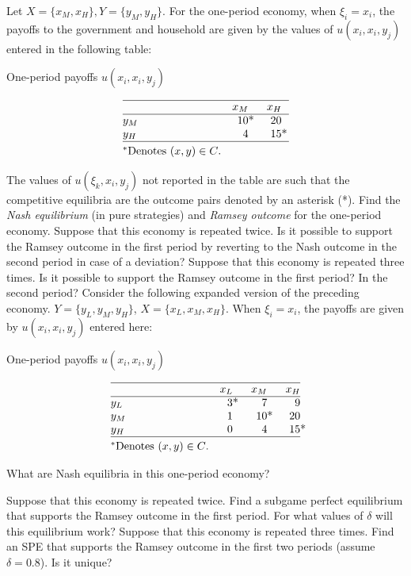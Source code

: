 Let $X= \{x_M,x_H\}, Y = \{y_M,y_H\}$. For the one-period economy,
when $\xi_i = x_i$, the payoffs to the government and household
are given by the values of $u(x_i,x_i,y_j)$ entered in
the following table:
\vfil\eject

\centerline{One-period payoffs $u(x_i,x_i,y_j)$}
$$\vbox{\offinterlineskip
\hrule
\halign{\strut #\hfil &\quad \hfil# &\quad \hfil# \cr
& $x_M$ & $x_H$ \cr \noalign{\hrule}
$y_M$ & $10\rlap{*}$ & $20$ \cr
$y_H$ & $4$ & $15\rlap{*}$ \cr\noalign{\hrule}
\noalign{\smallskip}
\hbox{$^\ast$Denotes $(x,y)\in C$.}\cr
              }}$$




\noindent
The values of $u(\xi_k,x_i,y_j)$ not reported in the table
are such that the competitive equilibria are the outcome pairs
denoted by an asterisk (*).
\medskip
{}  Find the {\it Nash equilibrium\/} (in pure
strategies) and {\it Ramsey outcome\/} for the one-period economy.
\smallskip
{} Suppose that this economy is repeated twice.  Is it
possible to support the Ramsey outcome in the first period by
reverting to the Nash outcome in the second period
in case of a deviation?
\smallskip
{} Suppose that this economy is repeated three times.  Is
it possible to support the Ramsey outcome in the first period?
In the second period?
\medskip
Consider the following expanded version of the preceding economy.
  $Y=\{y_L, y_M,y_H\}$, $X=\{ x_L,x_M,x_H\}$. When $\xi_i = x_i$,
the payoffs are given by $u(x_i,x_i,y_j)$ entered here:
\smallskip

\centerline{One-period payoffs  $u(x_i,x_i,y_j)$}
$$\vbox{\offinterlineskip
\hrule
\halign{\strut #\hfil &\quad \hfil# &\quad \hfil# &\quad \hfil#\cr
& $x_L$ & $x_M$ & $x_H$\cr \noalign{\hrule}
$y_L$ & $3\rlap{*}$ & $7$ & $9$\cr
$y_M$ & $1$ & $10\rlap{*}$ & 20\cr
$y_H$ & $0$ & $4$ & $15\rlap{*}$\cr \noalign{\hrule}
\noalign{\smallskip}
\hbox{$^\ast$Denotes $(x,y)\in C$.}\cr
         }}$$


\medskip
{}  What are  Nash equilibria in this one-period economy?

\smallskip
{}  Suppose that this economy is repeated twice.  Find a
subgame perfect equilibrium that supports the Ramsey outcome
in the first period.  For what values of $\delta$ will this
equilibrium work?
\smallskip
{}  Suppose that this economy is repeated three times.
Find an SPE that supports the Ramsey
outcome in the first two periods (assume $\delta = 0.8$).  Is it unique?

